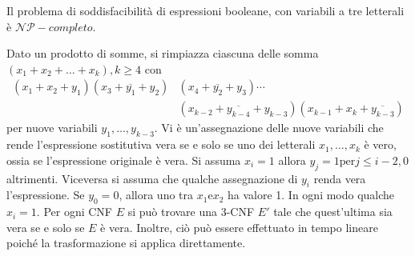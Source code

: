 \documentclass{subfiles}
\begin{document}
\begin{Theorem*}[3-SAT] Il problema di soddisfacibilità di espressioni booleane, con variabili a tre letterali è \(\mathcal{NP}-completo\).
    \begin{Proof*}
        Dato un prodotto di somme, si rimpiazza ciascuna delle somma \((x_{1} + x_{2} + \ldots + x_{k}), k \ge 4\) con
        \[\begin{aligned}
                (x_{1} + x_{2} + y_{1})(x_{3} + \overline{y_{1}} + y_{2}) & (x_{4} + \overline{y_{2}} + y_{3}) \cdots                                                \\
                                                                          & (x_{k - 2} + \overline{y_{k - 4}} + y_{k - 3})(x_{k - 1} + x_{k} + \overline{y_{k - 3}})
            \end{aligned}\]
        per nuove variabili \(y_{1}, \ldots, y_{k-3}\).
        Vi è un'assegnazione delle nuove variabili che rende l'espressione sostitutiva vera se e solo se uno dei letterali \(x_{1}, \ldots, x_{k}\) è vero,
        ossia se l'espressione originale è vera. Si assuma \(x_{i} = 1\) allora \(y_j = 1 \text{per} j \le i - 2, 0\) altrimenti.
        Viceversa si assuma che qualche assegnazione di \(y_{i}\) renda vera l'espressione. Se \(y_{0} = 0\), allora uno tra \(x_{1} \text{e} x_{2}\) ha valore 1.
        In ogni modo qualche \(x_{i} = 1\). Per ogni CNF \(E\) si può trovare una 3-CNF \(E'\) tale che quest'ultima sia vera se e solo se \(E\) è vera.
        Inoltre, ciò può essere effettuato in tempo lineare poiché la trasformazione si applica direttamente.
    \end{Proof*}

\end{Theorem*}
\end{document}
